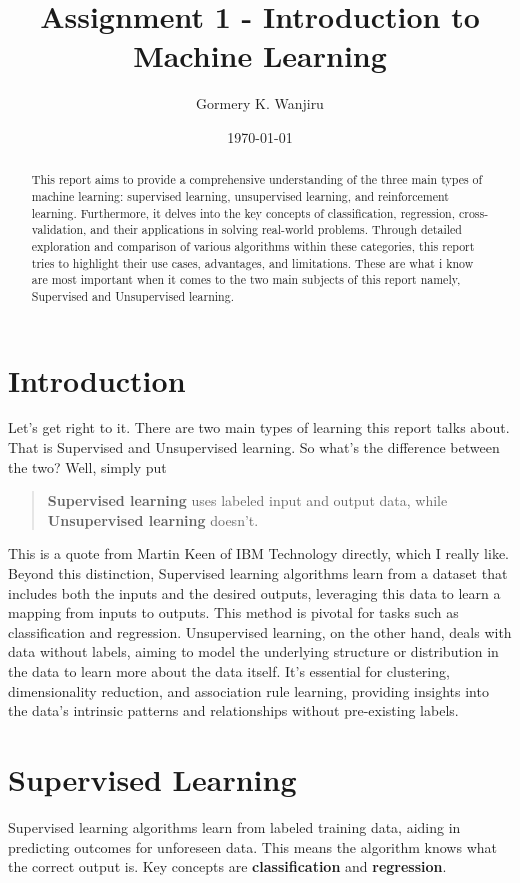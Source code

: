 \documentclass[11pt, a4paper]{article}
\title{Assignment 1 - Introduction to Machine Learning}
\author{Gormery K. Wanjiru}
\date{\today}
\begin{document}
\maketitle

\begin{abstract}
This report aims to provide a comprehensive understanding of the three main types of machine learning: supervised learning, unsupervised learning, and reinforcement learning. Furthermore, it delves into the key concepts of classification, regression, cross-validation, and their applications in solving real-world problems. Through detailed exploration and comparison of various algorithms within these categories, this report tries to highlight their use cases, advantages, and limitations. These are what i know are most important when it comes to the two main subjects of this report namely, Supervised and Unsupervised learning.
\end{abstract}


\section{Introduction}
Let's get right to it. There are two main types of learning this report talks about. That is Supervised and Unsupervised learning. So what's the difference between the two? Well, simply put
\begin{quote}
\textbf{Supervised learning} uses labeled input and output data, while \textbf{Unsupervised learning} doesn't.
\end{quote}
This is a quote from Martin Keen of IBM Technology directly, which I really like. Beyond this distinction, Supervised learning algorithms learn from a dataset that includes both the inputs and the desired outputs, leveraging this data to learn a mapping from inputs to outputs. This method is pivotal for tasks such as classification and regression. Unsupervised learning, on the other hand, deals with data without labels, aiming to model the underlying structure or distribution in the data to learn more about the data itself. It's essential for clustering, dimensionality reduction, and association rule learning, providing insights into the data's intrinsic patterns and relationships without pre-existing labels.
\section{Supervised Learning}
Supervised learning algorithms learn from labeled training data, aiding in predicting outcomes for unforeseen data. This means the algorithm knows what the correct output is. Key concepts are \textbf{classification} and \textbf{regression}.
\end{document}
